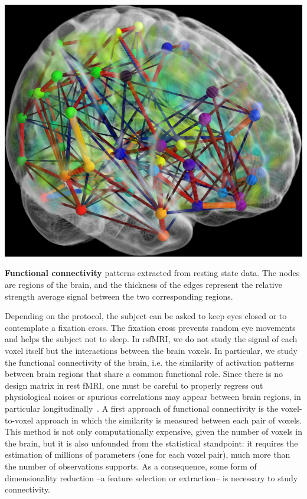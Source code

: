 \begin{marginfigure}%
  \includegraphics[width=1\linewidth]{figures/connectome.png}
  \caption{\textbf{Functional connectivity} patterns extracted from resting state data. The nodes are regions of the brain, and the thickness
  of the edges represent the relative strength average signal between the two corresponding regions.}
\end{marginfigure}

Depending on the protocol, the subject can be asked to keep eyes closed or
to contemplate a fixation cross. The fixation cross prevents random eye movements
and helps the subject not to sleep.
In rsfMRI, we do not study the signal of each voxel itself but the
interactions between the brain voxels. In particular, we study the functional
connectivity of the brain, i.e. the similarity of activation patterns between
brain regions that share a common functional role. Since there is no design
matrix in rest fMRI, one must be careful to properly regress out physiological
noises or spurious correlations may appear between brain regions, in particular
longitudinally~\citep{power2012,vandijk2012}.
A first approach of functional connectivity is the voxel-to-voxel approach in
which the similarity is measured between each pair of voxels. This method is
not only computationally expensive, given the number of voxels in the brain,
but it is also unfounded from the statistical standpoint: it requires the
estimation of millions of parameters (one for each voxel pair), much more than the number of observations
supports. As a consequence, some form of dimensionality reduction --a feature
selection or extraction-- is necessary to study connectivity.

